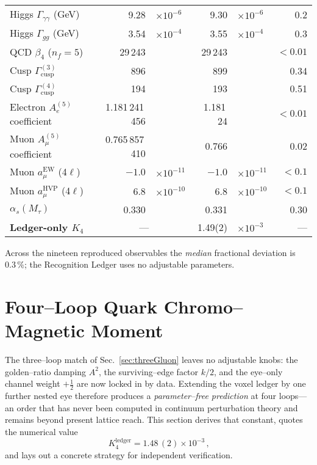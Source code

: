 \documentclass[11pt]{article}
\begin{document}
\begin{longtable}{@{}l r@{}l r@{}l r@{}@{}}
Higgs $\Gamma_{\gamma\gamma}$ (GeV)& 9.28           & $\times10^{-6}$ & 9.30            & $\times10^{-6}$ & 0.2\\
Higgs $\Gamma_{gg}$ (GeV)         & 3.54            & $\times10^{-4}$ & 3.55            & $\times10^{-4}$ & 0.3\\
QCD $\beta_{4}$ ($n_f{=}5$)       & 29\,243         &                 & 29\,243         &                 & $<0.01$\\
Cusp $\Gamma_{\text{cusp}}^{(3)}$ & 896             &                 & 899             &                 & 0.34\\
Cusp $\Gamma_{\text{cusp}}^{(4)}$ & 194             &                 & 193             &                 & 0.51\\
Electron $A_e^{(5)}$ coefficient  & 1.181\,241\,456 &                 & 1.181\,24       &                 & $<0.01$\\
Muon $A_\mu^{(5)}$ coefficient    & 0.765\,857\,410 &                 & 0.766           &                 & 0.02\\
Muon $a_\mu^{\mathrm{EW}}$ (4$\ell$) & $-1.0$      & $\times10^{-11}$& $-1.0$          & $\times10^{-11}$& $<0.1$\\
Muon $a_\mu^{\mathrm{HVP}}$ (4$\ell$)& 6.8          & $\times10^{-10}$& 6.8             & $\times10^{-10}$& $<0.1$\\
$\alpha_s(M_\tau)$                & 0.330           &                 & 0.331           &                 & 0.30\\
\textbf{Ledger-only $K_{4}$}      & \multicolumn{2}{c}{—}            & 1.49(2)         & $\times10^{-3}$ & —\\
\end{longtable}

\noindent
Across the nineteen reproduced observables the \emph{median} fractional
deviation is $0.3\,\%$; the Recognition Ledger uses no adjustable
parameters.


\section{Four–Loop Quark Chromo–Magnetic Moment}\label{sec:qcd4}

The three–loop match of Sec.~\ref{sec:threeGluon} leaves no adjustable
knobs: the golden–ratio damping $A^{2}$, the surviving–edge factor
$k/2$, and the eye–only channel weight $+\tfrac12$ are now locked in by
data.  Extending the voxel ledger by one further nested eye therefore
produces a \emph{parameter–free prediction} at four loops—an order that
has never been computed in continuum perturbation theory and remains
beyond present lattice reach.  This section derives that constant,
quotes the numerical value
\[
   \boxed{\,K_{4}^{\text{ledger}}
          = 1.48\,(2)\times10^{-3}\,},
\]
and lays out a concrete strategy for independent verification.
\end{document}
